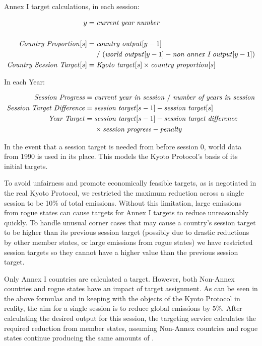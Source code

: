 Annex I target calculations, in each session:

\begin{align*}
y &= \text{\emph{current year number}}\\
\\
\text{\emph{Country Proportion}}[s] &= \text{\emph{country output}}[y - 1]\\
&~~~~/~(\text{\emph{world output}}[y - 1] - \text{\emph{non annex I output}}[y - 1])\\
\text{\emph{Country Session Target}}[s] &= \text{\emph{Kyoto target}}[s] \times \text{\emph{country proportion}}[s]\\
\end{align*}

In each Year:

\begin{align*}
\text{\emph{Session Progress}}  &= \text{\emph{current year in session}}~/~\text{\emph{number of years in session}}\\
\text{\emph{Session Target Difference}}&= \text{\emph{session target}}[s - 1] - \text{\emph{session target}}[s]\\
\text{\emph{Year Target}}&= \text{\emph{session target}}[s - 1] - \text{\emph{session target difference}}\\
&~~~~\times \text{\emph{session progress}} - \text{\emph{penalty}}\\
\end{align*}

In the event that a session target is needed from before session 0, world data from 1990 is used in its place. This models the Kyoto Protocol's basis of its initial targets.
 
To avoid unfairness and promote economically feasible targets, as is negotiated in the real Kyoto Protocol, we restricted the maximum reduction across a single session to be 10\% of total emissions. Without this limitation, large emissions from rogue states can cause targets for Annex I targets to reduce unreasonably quickly. To handle unusual corner cases that may cause a country's session target to be higher than its previous session target (possibly due to drastic reductions by other member states, or large emissions from rogue states) we have restricted session targets so they cannot have a higher value than the previous session target.
 
Only Annex I countries are calculated a target. However, both Non-Annex countries and rogue states have an impact of target assignment. As can be seen in the above formulas and in keeping with the objects of the Kyoto Protocol in reality, the aim for a single session is to reduce global \CO emissions by 5\%. After calculating the desired output for this session, the targeting service calculates the required reduction from member states, assuming Non-Annex countries and rogue states continue producing the same amounts of \CO.

